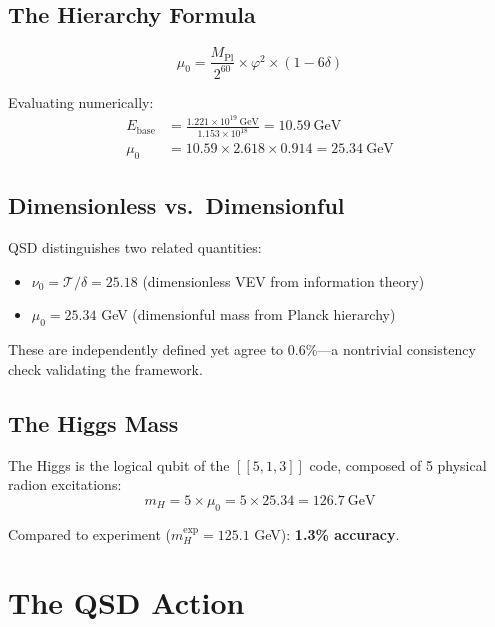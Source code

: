 \documentclass[11pt,a4paper]{article}
\theoremstyle{definition}
\newcommand{\Tc}{\mathcal{T}}           %
\newcommand{\dgeo}{\delta}              %
\newcommand{\nurad}{\nu_0}              %
\newcommand{\murad}{\mu_0}              %
\newcommand{\Mpl}{M_{\text{Pl}}}        %
\newcommand{\mH}{m_H}                   %
\begin{document}
\subsection{The Hierarchy Formula}

\begin{equation}
\boxed{\murad = \frac{\Mpl}{2^{60}} \times \varphi^2 \times (1 - 6\dgeo)}
\label{eq:hierarchy}
\end{equation}

Evaluating numerically:
\begin{align}
E_{\text{base}} &= \frac{1.221 \times 10^{19}~\text{GeV}}{1.153 \times 10^{18}} = 10.59~\text{GeV} \\
\murad &= 10.59 \times 2.618 \times 0.914 = 25.34~\text{GeV}
\end{align}

\subsection{Dimensionless vs.\ Dimensionful}

QSD distinguishes two related quantities:
\begin{itemize}[nosep]
    \item $\nurad = \Tc/\dgeo = 25.18$ (dimensionless VEV from information theory)
    \item $\murad = 25.34$ GeV (dimensionful mass from Planck hierarchy)
\end{itemize}

These are independently defined yet agree to 0.6\%---a nontrivial consistency check validating the framework.

\subsection{The Higgs Mass}

The Higgs is the logical qubit of the $[[5,1,3]]$ code, composed of 5 physical radion excitations:
\begin{equation}
\mH = 5 \times \murad = 5 \times 25.34 = 126.7~\text{GeV}
\end{equation}

Compared to experiment ($\mH^{\text{exp}} = 125.1$ GeV): \textbf{1.3\% accuracy}.

\section{The QSD Action}
\label{sec:action}
\end{document}
